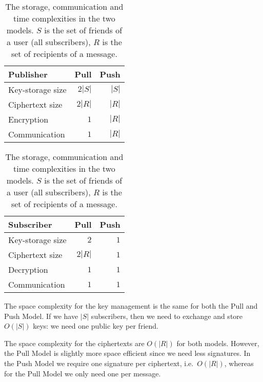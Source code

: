 \begin{table}
  \centering
  \caption{%
    The storage, communication and time complexities in the two models.
    \(S\) is the set of friends of a user (all subscribers), \(R\) is the set 
    of recipients of a message.
  }\label{Complexities}
  \begin{tabular}{lrr}
    Publisher
    & Pull
    & Push \\
    
    \toprule

    Key-storage size
    & \(2|S|\) & \(|S|\) \\

    \pause{}%
    Ciphertext size
    & \(2|R|\) & \(|R|\) \\

    Encryption
    & \(1\) & \(|R|\) \\

    \pause{}%
    Communication
    & \(1\) & \(|R|\) \\

    \bottomrule

  \end{tabular}
  \begin{tabular}{lrr}
    Subscriber
    & Pull & Push \\
    
    \toprule

    Key-storage size
    & \(2\) & \(1\) \\

    \pause{}%
    Ciphertext size
    & \(2|R|\) & \(1\) \\

    Decryption
    & \(1\) & \(1\) \\

    \pause{}%
    Communication
    & \(1\) & \(1\) \\

    \bottomrule

  \end{tabular}
\end{table}

The space complexity for the key management is the same for both the Pull and 
Push Model.
If we have \(|S|\) subscribers, then we need to exchange and store \(O(|S|)\) 
keys:
we need one public key per friend.

The space complexity for the ciphertexts are \(O(|R|)\) for both models.
However, the Pull Model is slightly more space efficient since we need less 
signatures.
In the Push Model we require one signature per ciphertext, i.e.\ \(O(|R|)\), 
whereas for the Pull Model we only need one per message.


